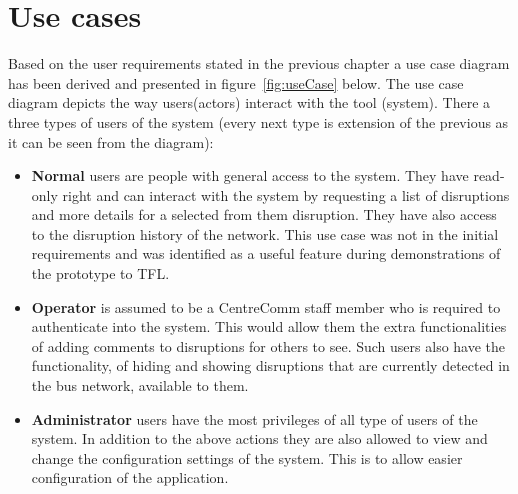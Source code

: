 \section{Use cases}
Based on the user requirements stated in the previous chapter a use case diagram has been derived and presented in figure~\ref{fig:useCase} below. The use case diagram depicts the way users(actors) interact with the tool (system). There a three types of users of the system (every next type is extension of the previous as it can be seen from the diagram):
\begin{itemize}
	\item \textbf{Normal} users are people with general access to the system. They have read-only right and can interact with the system by requesting a list of disruptions and more details for a selected from them disruption. They have also access to the disruption history of the network. This use case was not in the initial requirements and was identified as a useful feature during demonstrations of the prototype to TFL.
	\item \textbf{Operator} is assumed to be a CentreComm staff member who is required to authenticate into the system. This would allow them the extra functionalities of adding comments to disruptions for others to see. Such users also have the functionality, of hiding and showing disruptions that are currently detected in the bus network, available to them.
	\item \textbf{Administrator} users have the most privileges of all type of users of the system. In addition to the above actions they are also allowed to view and change the configuration settings of the system. This is to allow easier configuration of the application.
\end{itemize}

